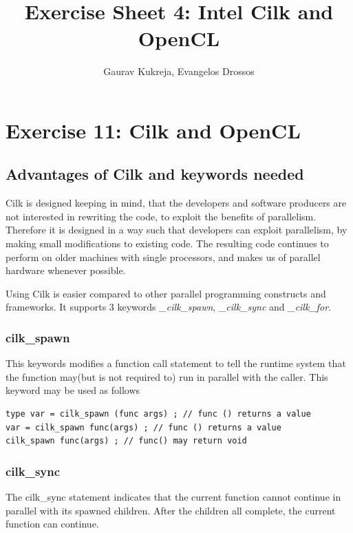 \documentclass[]{scrartcl}
\title{Exercise Sheet 4: Intel Cilk and OpenCL}
\author{Gaurav Kukreja, Evangelos Drossos}
\begin{document}
\lstset{language=C}

\maketitle

\begin{abstract}

\end{abstract}

\section{Exercise 11: Cilk and OpenCL}

\subsection{Advantages of Cilk and keywords needed}
Cilk is designed keeping in mind, that the developers and software producers
are not interested in rewriting the code, to exploit the benefits of parallelism.
Therefore it is designed in a way such that developers can exploit parallelism, by 
making small modifications to existing code. The resulting code continues to
perform on older machines with single processors, and makes us of parallel hardware
whenever possible.

Using Cilk is easier compared to other parallel programming constructs and frameworks.
It supports 3 keywords \textit{\_cilk\_spawn}, \textit{\_cilk\_sync} and \textit{\_cilk\_for}.

\subsubsection{cilk\_spawn}
This keywords modifies a function call statement to tell the runtime system that
the function may(but is not required to) run in parallel with the caller. This keyword
may be used as follows

\begin{lstlisting}
type var = cilk_spawn (func args) ; // func () returns a value
var = cilk_spawn func(args) ; // func () returns a value
cilk_spawn func(args) ; // func() may return void
\end{lstlisting}

\subsubsection{cilk\_sync}
The cilk\_sync statement indicates that the current function cannot continue in parallel with its
spawned children. After the children all complete, the current function can continue.
\end{document}
